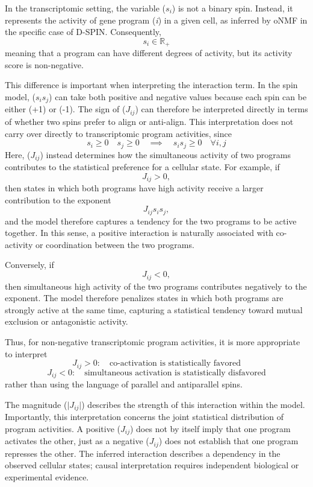 \documentclass[11pt,a4paper]{article}
\begin{document}
In the transcriptomic setting, the variable ($s_i$) is not a binary spin. Instead, it represents the activity of gene program (\textit{i}) in a given cell, as inferred by oNMF in the specific case of D-SPIN. Consequently,
\[
s_i \in \mathbb{R}_+
\]
meaning that a program can have different degrees of activity, but its activity score is non-negative.

This difference is important when interpreting the interaction term. In the spin model, ($s_i s_j$) can take both positive and negative values because each spin can be either (+1) or (-1). The sign of ($J_{ij}$) can therefore be interpreted directly in terms of whether two spins prefer to align or anti-align. This interpretation does not carry over directly to transcriptomic program activities, since
\[
s_i \geq 0\quad s_j \geq 0 \quad \implies \quad s_i s_j \geq 0 \quad \forall i,j
\]
Here, ($J_{ij}$) instead determines how the simultaneous activity of two programs contributes to the statistical preference for a cellular state. For example, if
\[
J_{ij}>0,
\]
then states in which both programs have high activity receive a larger contribution to the exponent
\[
J_{ij}s_i s_j,
\]
and the model therefore captures a tendency for the two programs to be active together. In this sense, a positive interaction is naturally associated with co-activity or coordination between the two programs.

Conversely, if
\[
J_{ij}<0,
\]
then simultaneous high activity of the two programs contributes negatively to the exponent. The model therefore penalizes states in which both programs are strongly active at the same time, capturing a statistical tendency toward mutual exclusion or antagonistic activity.

Thus, for non-negative transcriptomic program activities, it is more appropriate to interpret
\[
\boxed{
	J_{ij}>0:\quad \text{co-activation is statistically favored}
}
\]
\[
\boxed{
	J_{ij}<0:\quad \text{simultaneous activation is statistically disfavored}
}
\]
rather than using the language of parallel and antiparallel spins.

The magnitude ($\lvert J_{ij}\rvert$) describes the strength of this interaction within the model. Importantly, this interpretation concerns the joint statistical distribution of program activities. A positive ($J_{ij}$) does not by itself imply that one program activates the other, just as a negative ($J_{ij}$) does not establish that one program represses the other. The inferred interaction describes a dependency in the observed cellular states; causal interpretation requires independent biological or experimental evidence.
\end{document}
